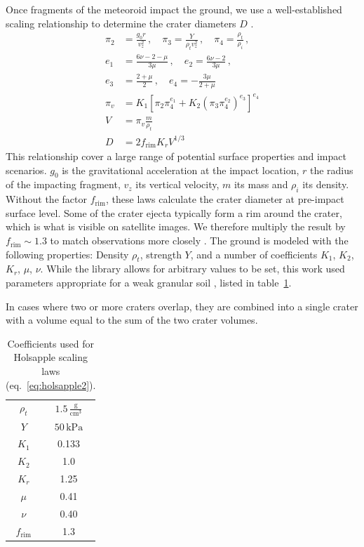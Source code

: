 Once fragments of the meteoroid impact the ground, we use a well-established scaling relationship to determine the crater diameters $D$ \citep{holsapple1987scaling}.
\begin{align}
    \pi_2 &= \frac{g_0 r}{v_z^2}\,,\quad\pi_3 = \frac{Y}{\rho_t v_z^2}\,,\quad\pi_4 = \frac{\rho_t}{\rho_i}\,, \nonumber \\
    e_1 &= \frac{6\nu - 2 - \mu}{3\mu}\,,\quad e_2 = \frac{6\nu-2}{3\mu} \,, \nonumber \\
    e_3 &= \frac{2+\mu}{2}\,,\quad e_4 = -\frac{3\mu}{2 + \mu} \nonumber \\
    \pi_v &= K_1 \left[\pi_2 \pi_4^{e_1} + K_2 \left(\pi_3 \pi_4^{e_2}\right)^{e_3}\right]^{e_4} \nonumber \\
    V &= \pi_v \frac{m}{\rho_t} \nonumber \\
    D &= 2f_\mathrm{rim} K_r V^{1/3} \label{eq:holsapple2}
\end{align}
This relationship cover a large range of potential surface properties and impact scenarios.
$g_0$ is the gravitational acceleration at the impact location, $r$ the radius of the impacting fragment, $v_z$ its vertical velocity, $m$ its mass and $\rho_i$ its density. Without the factor $f_\mathrm{rim}$, these laws calculate the crater diameter at pre-impact surface level.
Some of the crater ejecta typically form a rim around the crater, which is what is visible on satellite images. We therefore multiply the result by $f_\mathrm{rim} \sim 1.3$ to match observations more closely \citep{daubar2020newcrater}. The ground is modeled with the following properties: Density $\rho_t$, strength $Y$, and a number of coefficients $K_1$, $K_2$, $K_r$, $\mu$, $\nu$. While the library allows for arbitrary values to be set, this work used parameters appropriate for a weak granular soil \citep{holsapple1987scaling}, listed in table~\ref{tab:holsapple_coeff}.  

In cases where two or more craters overlap, they are combined into a single crater with a volume equal to the sum of the two crater volumes.

\begin{table}[htbp]
    \centering
    \begin{tabular}{c|c}
        $\rho_t$ & $1.5\,\mathrm{\frac{g}{cm^3}}$ \\
        $Y$ & $50\,\mathrm{kPa}$ \\
        $K_1$ & 0.133 \\
        $K_2$ & 1.0 \\
        $K_r$ & 1.25 \\
        $\mu$ & 0.41 \\
        $\nu$ & 0.40 \\
        $f_\mathrm{rim}$ & 1.3
    \end{tabular}
    \caption{Coefficients used for Holsapple scaling laws (eq.~\ref{eq:holsapple2}).}
    \label{tab:holsapple_coeff}
\end{table}

